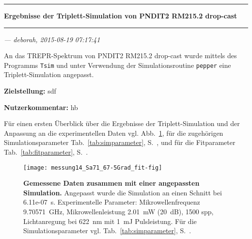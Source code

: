 \documentclass{article}
\begin{document}
\thispagestyle{empty}

\vspace*{-1.5cm}

\noindent\rule[1.5ex]{\textwidth}{1pt}

\begin{sffamily}\bfseries\large
Ergebnisse der Triplett-Simulation von PNDIT2 RM215.2 drop-cast
\end{sffamily}

\noindent\rule{\textwidth}{1pt}

\begin{flushright}\slshape
--- deborah, 2015-08-19 07:17:41
\end{flushright}

\vspace*{1.5em}

An das TREPR-Spektrum von PNDIT2 RM215.2 drop-cast wurde mittels des Programms \texttt{Tsim} und unter Verwendung der Simulationsroutine \texttt{pepper} eine Triplett-Simulation angepasst.


\textbf{Zielstellung:} sdf

\textbf{Nutzerkommentar:} hb


Für einen ersten Überblick über die Ergebnisse der Triplett-Simulation und der Anpassung an die experimentellen Daten vgl. Abb.~\ref{fig:ergebnisse}, für die zugehörigen Simulationsparameter Tab.~\ref{tab:simparameter}, S.~\pageref{tab:simparameter}, und für die Fitparameter Tab.~\ref{tab:fitparameter}, S.~\pageref{tab:fitparameter}.


\begin{figure}[h]
\centering

\texttt{[image: messung14\_Sa71\_67-5Grad\_fit-fig]}

\caption{\textbf{Gemessene Daten zusammen mit einer angepassten Simulation.} Angepasst wurde die Simulation an einen Schnitt bei 6.11e-07~s. Experimentelle Parameter: Mikrowellenfrequenz  9.70571~GHz, Mikrowellenleistung  2.01~mW (20~dB), 1500 spp, Lichtanregung bei 622~nm mit   1~mJ Pulsleistung. Für die Simulationsparameter vgl. Tab.~\ref{tab:simparameter}, S.~\pageref{tab:simparameter}.}
\label{fig:ergebnisse}
\end{figure}

\begin{center}
\setlength{\fboxsep}{1.5ex}\setlength{\fboxrule}{.75pt}
\end{center}
\end{document}
